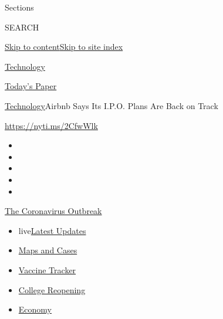 Sections

SEARCH

\protect\hyperlink{site-content}{Skip to
content}\protect\hyperlink{site-index}{Skip to site index}

\href{https://www.nytimes3xbfgragh.onion/section/technology}{Technology}

\href{https://myaccount.nytimes3xbfgragh.onion/auth/login?response_type=cookie\&client_id=vi}{}

\href{https://www.nytimes3xbfgragh.onion/section/todayspaper}{Today's
Paper}

\href{/section/technology}{Technology}\textbar{}Airbnb Says Its I.P.O.
Plans Are Back on Track

\url{https://nyti.ms/2CfwWlk}

\begin{itemize}
\item
\item
\item
\item
\item
\end{itemize}

\href{https://www.nytimes3xbfgragh.onion/news-event/coronavirus?action=click\&pgtype=Article\&state=default\&region=TOP_BANNER\&context=storylines_menu}{The
Coronavirus Outbreak}

\begin{itemize}
\tightlist
\item
  live\href{https://www.nytimes3xbfgragh.onion/2020/08/03/world/coronavirus-covid-19.html?action=click\&pgtype=Article\&state=default\&region=TOP_BANNER\&context=storylines_menu}{Latest
  Updates}
\item
  \href{https://www.nytimes3xbfgragh.onion/interactive/2020/us/coronavirus-us-cases.html?action=click\&pgtype=Article\&state=default\&region=TOP_BANNER\&context=storylines_menu}{Maps
  and Cases}
\item
  \href{https://www.nytimes3xbfgragh.onion/interactive/2020/science/coronavirus-vaccine-tracker.html?action=click\&pgtype=Article\&state=default\&region=TOP_BANNER\&context=storylines_menu}{Vaccine
  Tracker}
\item
  \href{https://www.nytimes3xbfgragh.onion/2020/08/02/us/covid-college-reopening.html?action=click\&pgtype=Article\&state=default\&region=TOP_BANNER\&context=storylines_menu}{College
  Reopening}
\item
  \href{https://www.nytimes3xbfgragh.onion/live/2020/08/03/business/stock-market-today-coronavirus?action=click\&pgtype=Article\&state=default\&region=TOP_BANNER\&context=storylines_menu}{Economy}
\end{itemize}

